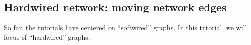 \documentclass[11pt]{article}
\begin{document}
\begin {enumerate}
%
%

\end{enumerate}
\subsection{Hardwired network: moving network edges}
\label{subsec:netmove}

So far, the tutorials have centered on ``softwired'' graphs. In this tutorial, we will 
focus of ``hardwired'' graphs.
\end{document}
